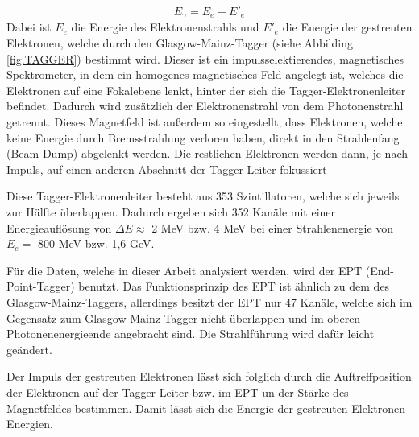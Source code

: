 \documentclass[a4paper,11pt,oneside,final,german,openbib,pdftex]{scrbook}
\begin{document}
{  \begin{equation}
  E_{\gamma}= E_{e^{}}-E'_{e}
  \label{eq.Photonenenergie}
  \end{equation}
 Dabei ist $E_e$ die Energie des Elektronenstrahls und $E'_{e}$ die Energie der gestreuten Elektronen, welche durch den Glasgow-Mainz-Tagger (siehe Abbilding \ref{fig.TAGGER}) bestimmt wird.
 Dieser ist ein impulsselektierendes, magnetisches Spektrometer, in dem ein homogenes magnetisches Feld angelegt ist, welches die Elektronen auf eine Fokalebene lenkt, hinter der sich die Tagger-Elektronenleiter befindet. Dadurch wird zus\"atzlich der Elektronenstrahl von dem Photonenstrahl getrennt. Dieses Magnetfeld ist außerdem so eingestellt, dass Elektronen, welche keine Energie durch Bremsstrahlung verloren haben, direkt in den Strahlenfang (Beam-Dump) abgelenkt werden. Die restlichen Elektronen werden dann, je nach Impuls, auf einen anderen Abschnitt der Tagger-Leiter fokussiert
 
 Diese Tagger-Elektronenleiter besteht aus 353 Szintillatoren, welche sich jeweils zur H\"alfte \"uberlappen.
 Dadurch ergeben sich 352 Kan\"ale mit einer Energieaufl\"osung von $\Delta E \approx$  2 MeV bzw. 4 MeV bei einer Strahlenenergie von $E_e=$ 800 MeV bzw. 1,6 GeV. 
 
 F\"ur die Daten, welche in dieser Arbeit analysiert werden, wird der EPT (End-Point-Tagger) benutzt. Das Funktionsprinzip des EPT ist \"ahnlich zu dem des Glasgow-Mainz-Taggers, allerdings besitzt der EPT nur 47 Kan\"ale, welche sich im Gegensatz zum Glasgow-Mainz-Tagger nicht \"uberlappen und im oberen Photonenenergieende angebracht sind. Die Strahlf\"uhrung wird daf\"ur leicht ge\"andert.
 

Der Impuls der gestreuten Elektronen l\"asst sich folglich durch die Auftreffposition der Elektronen auf der Tagger-Leiter bzw. im EPT un der St\"arke des Magnetfeldes bestimmen. Damit l\"asst sich die Energie der gestreuten Elektronen Energien.
 
}
\end{document}
